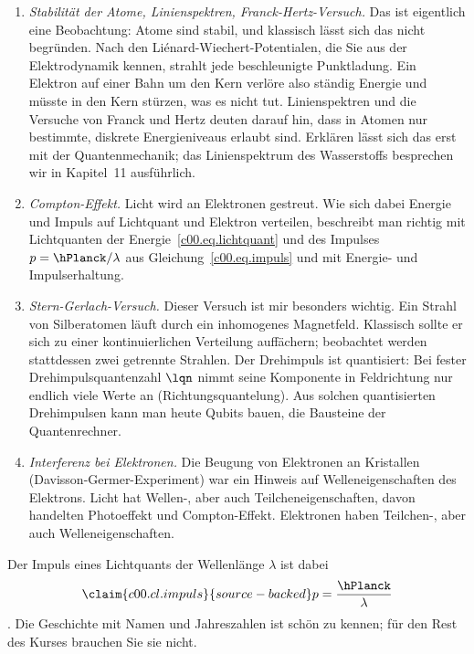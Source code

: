 \begin{enumerate}
  \item \emph{Stabilität der Atome, Linienspektren, Franck-Hertz-Versuch.} Das ist
    eigentlich eine Beobachtung: Atome sind stabil, und klassisch lässt sich das nicht
    begründen. Nach den Liénard-Wiechert-Potentialen, die Sie aus der Elektrodynamik
    kennen, strahlt jede beschleunigte Punktladung. Ein Elektron auf einer Bahn um den Kern
    verlöre also ständig Energie und müsste in den Kern stürzen, was es nicht tut.
    Linienspektren und die Versuche von Franck und Hertz deuten darauf hin, dass in Atomen
    nur bestimmte, diskrete Energieniveaus erlaubt sind. Erklären lässt sich das erst mit
    der Quantenmechanik; das Linienspektrum des Wasserstoffs besprechen wir in Kapitel~11
    ausführlich.
  \item \emph{Compton-Effekt.} Licht wird an Elektronen gestreut. Wie sich dabei Energie
    und Impuls auf Lichtquant und Elektron verteilen, beschreibt man richtig mit
    Lichtquanten der Energie~\eqref{c00.eq.lichtquant} und des Impulses
    $p = \hPlanck/\lambda$ aus Gleichung~\eqref{c00.eq.impuls} und mit Energie- und
    Impulserhaltung.
  \item \emph{Stern-Gerlach-Versuch.} Dieser Versuch ist mir besonders wichtig. Ein
    Strahl von Silberatomen läuft durch ein inhomogenes Magnetfeld. Klassisch sollte er sich
    zu einer kontinuierlichen Verteilung auffächern; beobachtet werden stattdessen zwei
    getrennte Strahlen. Der Drehimpuls ist quantisiert: Bei fester Drehimpulsquantenzahl
    $\lqn$ nimmt seine Komponente in Feldrichtung nur endlich viele Werte an
    (Richtungsquantelung). Aus solchen quantisierten Drehimpulsen kann man heute Qubits
    bauen, die Bausteine der Quantenrechner.
  \item \emph{Interferenz bei Elektronen.} Die Beugung von Elektronen an Kristallen
    (Davisson-Germer-Experiment) war ein Hinweis auf Welleneigenschaften des Elektrons.
    Licht hat Wellen-, aber auch Teilcheneigenschaften, davon handelten Photoeffekt und
    Compton-Effekt. Elektronen haben Teilchen-, aber auch Welleneigenschaften.
\end{enumerate}
Der Impuls eines Lichtquants der Wellenlänge $\lambda$ ist dabei
\begin{equation}\label{c00.eq.impuls}\claim{c00.cl.impuls}{source-backed}
  p = \frac{\hPlanck}{\lambda}
\end{equation}
. Die Geschichte mit Namen und
Jahreszahlen ist schön zu kennen; für den Rest des Kurses brauchen Sie sie
nicht.

